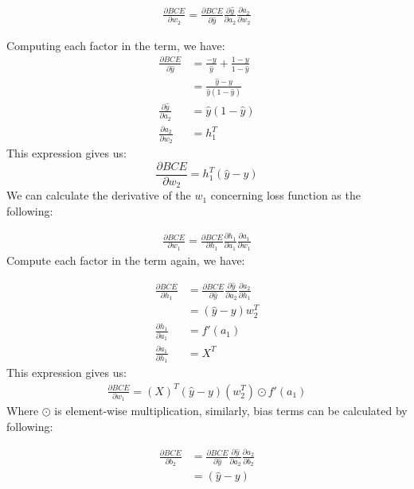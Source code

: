 \documentclass[a4paper, nobind]{templates/ociamthesis}
\begin{document}
\[
\begin{aligned} 
\frac{\partial BCE}{\partial w_{2}}=\frac{\partial BCE}{\partial \hat{y}} \frac{\partial \hat{y}}{\partial a_{2}} \frac{\partial a_{2}}{\partial w_{2}}
\end{aligned}
\]

\noindent Computing each factor in the term, we have:
\[
\begin{aligned}
\frac{\partial BCE}{\partial \hat{y}} &=\frac{-y}{\hat{y}}+\frac{1-y}{1-\hat{y}} \\
&=\frac{\hat{y}-y}{\hat{y}\left(1-\hat{y}\right)} \\
\frac{\partial \hat{y}}{\partial a_{2}} &=\hat{y}\left(1-\hat{y}\right) \\
\frac{\partial a_{2}}{\partial w_{2}} &=h_{1}^T
\end{aligned}
\]
This expression gives us:
\[
\frac{\partial BCE}{\partial w_{2}}=h_{1}^T\left(\hat{y}-y\right)
\]
We can calculate the derivative of the \(w_1\) concerning loss function as the following:

\[
\begin{aligned} 
\frac{\partial BCE}{\partial w_{1}}=\frac{\partial BCE}{\partial h_1} \frac{\partial h_1}{\partial a_{1}} \frac{\partial a_{1}}{\partial w_{1}}
\end{aligned}
\]
Compute each factor in the term again, we have:

\[
\begin{aligned}
\frac{\partial BCE}{\partial h_1} &= \frac{\partial BCE}{\partial \hat{y}} \frac{\partial \hat{y}}{\partial a_{2}} \frac{\partial a_{2}}{\partial h_{1}}  \\
&= \left(\hat{y}-y\right) w_{2}^T \\
\frac{\partial h_1}{\partial a_{1}} &=f'(a_1) \\
\frac{\partial a_{1}}{\partial h_{1}} &=X^T
\end{aligned}
\]
This expression gives us:
\[
\begin{aligned}
\frac{\partial BCE}{\partial w_{1}}= \left(X\right)^T\left(\hat{y}-y\right)\left(w_{2}^T\right) \odot f'(a_1)
\end{aligned}
\]
Where \(\odot\) is element-wise multiplication, similarly, bias terms can be calculated by following:

\[
\begin{aligned} 
\frac{\partial BCE}{\partial b_{2}}&=\frac{\partial BCE}{\partial \hat{y}} \frac{\partial \hat{y}}{\partial a_{2}} \frac{\partial a_{2}}{\partial b_{2}} \\
&= \left(\hat{y}-y\right)
\end{aligned}
\]
\end{document}
